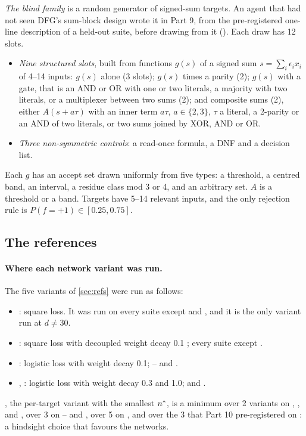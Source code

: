 \emph{The blind family} is a random generator of signed-sum targets. An agent that had not seen DFG's sum-block design wrote it in Part 9, from the pre-registered one-line description of a held-out suite, before drawing from it (). Each draw has 12 slots.
\begin{itemize}
\item \emph{Nine structured slots}, built from functions $g(s)$ of a signed sum $s=\sum_i\epsilon_ix_i$ of 4--14 inputs: $g(s)$ alone (3 slots); $g(s)$ times a parity (2); $g(s)$ with a gate, that is an AND or OR with one or two literals, a majority with two literals, or a multiplexer between two sums (2); and composite sums (2), either $A(s+a\tau)$ with an inner term $a\tau$, $a\in\{2,3\}$, $\tau$ a literal, a 2-parity or an AND of two literals, or two sums joined by XOR, AND or OR.
\item \emph{Three non-symmetric controls}: a read-once formula, a DNF and a decision list.
\end{itemize}
Each $g$ has an accept set drawn uniformly from five types: a threshold, a centred band, an interval, a residue class mod 3 or 4, and an arbitrary set. $A$ is a threshold or a band. Targets have 5--14 relevant inputs, and the only rejection rule is $P(f=+1)\in[0.25,0.75]$.

\subsection{The references}\label{app:refs}

\paragraph{Where each network variant was run.} The five variants of \cref{sec:refs} were run as follows:
\begin{itemize}
\item {}: square loss. It was run on every suite except  and , and it is the only variant run at $d\ne30$.
\item {}: square loss with decoupled weight decay 0.1 \cite{loshchilov2019adamw}; every suite except .
\item {}: logistic loss with weight decay 0.1; -- and .
\item {}, : logistic loss with weight decay 0.3 and 1.0;  and .
\end{itemize}
, the per-target variant with the smallest $n^{*}$, is a minimum over 2 variants on , ,  and , over 3 on -- and , over 5 on , and over the 3 that Part 10 pre-registered on : a hindsight choice that favours the networks.

